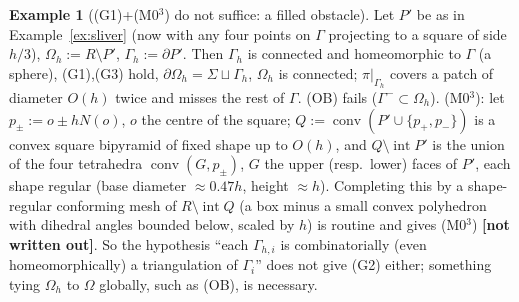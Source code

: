 \documentclass[11pt]{article}
\theoremstyle{definition}
\newtheorem{example}[theorem]{Example}
\newcommand{\Gh}{\Gamma_h}
\newcommand{\Oh}{\Omega_h}
\newcommand{\status}[1]{\textbf{[#1]}}
\begin{document}
\begin{example}[(G1)+(M0$^3$) do not suffice: a filled obstacle]\label{ex:filled}
Let $P'$ be as in Example~\ref{ex:sliver} (now with any four points on $\Gamma$ projecting to a square of side $h/3$), $\Oh:=R\setminus P'$, $\Gh:=\partial P'$. Then $\Gh$ is connected and homeomorphic to $\Gamma$ (a sphere), (G1),(G3) hold, $\partial\Oh=\Sigma\sqcup\Gh$, $\Oh$ is connected; $\pi|_{\Gh}$ covers a patch of diameter $O(h)$ twice and misses the rest of $\Gamma$. (OB) fails ($\Gamma^-\subset\Oh$). (M0$^3$): let $p_\pm:=o\pm hN(o)$, $o$ the centre of the square; $Q:=\operatorname{conv}(P'\cup\{p_+,p_-\})$ is a convex square bipyramid of fixed shape up to $O(h)$, and $Q\setminus\operatorname{int}P'$ is the union of the four tetrahedra $\operatorname{conv}(G,p_\pm)$, $G$ the upper (resp.\ lower) faces of $P'$, each shape regular (base diameter $\approx0.47h$, height $\approx h$). Completing this by a shape-regular conforming mesh of $R\setminus\operatorname{int}Q$ (a box minus a small convex polyhedron with dihedral angles bounded below, scaled by $h$) is routine and gives (M0$^3$) \status{not written out}. So the hypothesis ``each $\Gamma_{h,i}$ is combinatorially (even homeomorphically) a triangulation of $\Gamma_i$'' does not give (G2) either; something tying $\Oh$ to $\Omega$ globally, such as (OB), is necessary.
\end{example}
\end{document}
